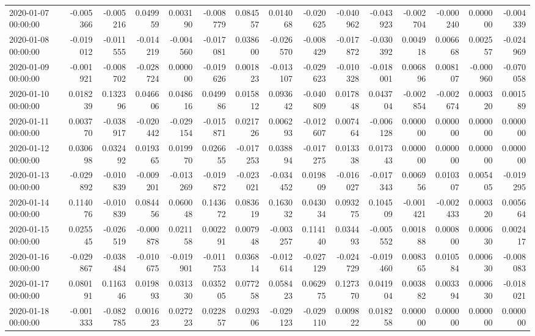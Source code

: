 \begin{tabular}{lrrrrrrrrrrrrrr}
2020-01-07 00:00:00 & -0.005366 & -0.005216 & 0.049959 & 0.003190 & -0.008779 & 0.084557 & 0.014068 & -0.020625 & -0.040962 & -0.043923 & -0.002704 & -0.000240 & 0.000000 & -0.004339 \\
2020-01-08 00:00:00 & -0.019012 & -0.011555 & -0.014219 & -0.004560 & -0.017081 & 0.038600 & -0.026570 & -0.008429 & -0.017872 & -0.030392 & 0.004918 & 0.006668 & 0.002557 & -0.024969 \\
2020-01-09 00:00:00 & -0.001921 & -0.008702 & -0.028724 & 0.000000 & -0.019626 & 0.001823 & -0.013107 & -0.029623 & -0.010328 & -0.018001 & 0.006896 & 0.008107 & -0.000960 & -0.070058 \\
2020-01-10 00:00:00 & 0.018239 & 0.132396 & 0.046606 & 0.048616 & 0.049986 & 0.015812 & 0.093642 & -0.040809 & 0.017848 & 0.043704 & -0.002854 & -0.002674 & 0.000320 & 0.001589 \\
2020-01-11 00:00:00 & 0.003770 & -0.038917 & -0.020442 & -0.029154 & -0.015871 & 0.021726 & 0.006293 & -0.012607 & 0.007464 & -0.006128 & 0.000000 & 0.000000 & 0.000000 & 0.000000 \\
2020-01-12 00:00:00 & 0.030698 & 0.032492 & 0.019365 & 0.019970 & 0.026655 & -0.017253 & 0.038894 & -0.017275 & 0.013338 & 0.017343 & 0.000000 & 0.000000 & 0.000000 & 0.000000 \\
2020-01-13 00:00:00 & -0.029892 & -0.010839 & -0.009201 & -0.013269 & -0.019872 & -0.023021 & -0.034452 & 0.019809 & -0.016027 & -0.017343 & 0.006956 & 0.010307 & 0.005405 & -0.019295 \\
2020-01-14 00:00:00 & 0.114076 & -0.010839 & 0.084456 & 0.060048 & 0.143672 & 0.083619 & 0.163032 & 0.043034 & 0.093275 & 0.104509 & -0.001421 & -0.002433 & 0.000320 & 0.005664 \\
2020-01-15 00:00:00 & 0.025545 & -0.026519 & -0.000878 & 0.021158 & 0.002291 & 0.007948 & -0.003257 & 0.114140 & 0.034493 & -0.005552 & 0.001888 & 0.000800 & 0.000630 & 0.002417 \\
2020-01-16 00:00:00 & -0.029867 & -0.038484 & -0.010675 & -0.019901 & -0.011753 & 0.036814 & -0.012614 & -0.027129 & -0.024729 & -0.019460 & 0.008365 & 0.010584 & 0.000630 & -0.008083 \\
2020-01-17 00:00:00 & 0.080191 & 0.116346 & 0.019893 & 0.031330 & 0.035205 & 0.077258 & 0.058423 & 0.062975 & 0.127370 & 0.041904 & 0.003882 & 0.003394 & 0.000630 & -0.018021 \\
2020-01-18 00:00:00 & -0.001333 & -0.082785 & 0.001623 & 0.027223 & 0.022857 & 0.029306 & -0.029123 & -0.029110 & 0.009822 & 0.018258 & 0.000000 & 0.000000 & 0.000000 & 0.000000 \\

\end{tabular}
